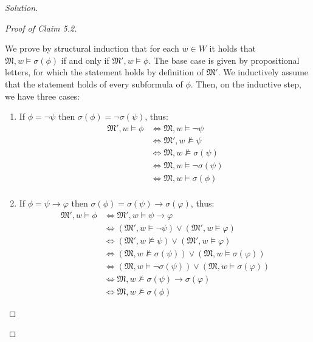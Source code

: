 \documentclass[12pt,a4paper]{report}
\theoremstyle{definition}
\newcommand{\model}[1]{\mathfrak{#1}}           %
\begin{document}
\begin{proof}[Solution]
\begin{proof}[Proof of Claim 5.2]
\begin{itemize}
                We prove by structural induction that for each $w \in W$ it holds that $\model{M}, w \models \sigma(\phi)$ if and only if $\model{M'}, w \models \phi$. The base case is given by propositional letters, for which the statement holds by definition of $\model{M'}$. We inductively assume that the statement holds of every subformula of $\phi$. Then, on the inductive step, we have three cases:
                \begin{enumerate}
                    \item If $\phi = \lnot \psi$ then $\sigma(\phi) = \lnot \sigma(\psi)$, thus:
                    \[\begin{split}
                        \model{M'}, w \models \phi &\iff \model{M}, w \models \lnot \psi \\
                        & \iff \model{M'}, w \not\models \psi \\
                        & \iff \model{M}, w \not\models \sigma(\psi) \\
                        & \iff \model{M}, w \models \lnot \sigma(\psi) \\
                        & \iff \model{M}, w \models \sigma(\phi) \\
                    \end{split}\]

                    \item If $\phi = \psi \to \varphi$ then $\sigma(\phi) = \sigma(\psi) \to \sigma(\varphi)$, thus:
                    \[\begin{split}
                        \model{M'}, w \models \phi &\iff \model{M'}, w \models \psi \to \varphi \\
                        & \iff (\model{M'}, w \models \lnot \psi) \lor (\model{M'}, w \models \varphi)\\
                        & \iff (\model{M'}, w \not \models \psi) \lor (\model{M'}, w \models \varphi)\\
                        & \iff (\model{M}, w \not \models \sigma(\psi)) \lor (\model{M}, w \models \sigma(\varphi))\\
                        & \iff (\model{M}, w \models \lnot \sigma(\psi)) \lor (\model{M}, w \models \sigma(\varphi))\\
                        & \iff \model{M}, w \not\models \sigma(\psi) \to \sigma(\varphi) \\
                        & \iff \model{M}, w \not\models \sigma(\phi)
                    \end{split}\]


\end{enumerate}
\end{itemize}
\end{proof}
\end{proof}
\end{document}
